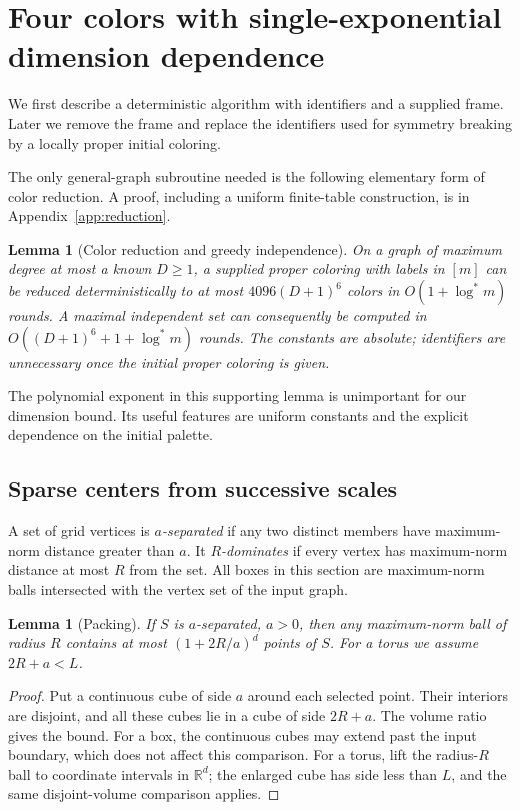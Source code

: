 \documentclass[11pt]{article}
\newtheorem{lemma}[theorem]{Lemma}
\theoremstyle{definition}\newtheorem{definition}[theorem]{Definition}
\theoremstyle{remark}\newtheorem{remark}[theorem]{Remark}
\newcommand{\R}{\mathbb R}
\newcommand{\ls}{\log^*}
\begin{document}
\section{Four colors with single-exponential dimension dependence}
\label{sec:upper}

We first describe a deterministic algorithm with identifiers and a
supplied frame. Later we remove the frame and replace the identifiers
used for symmetry breaking by a locally proper initial coloring.

The only general-graph subroutine needed is the following elementary
form of color reduction. A proof, including a uniform finite-table
construction, is in Appendix~\ref{app:reduction}.

\begin{lemma}[Color reduction and greedy independence]\label{lem:reduction}
On a graph of maximum degree at most a known $D\ge1$, a supplied
proper coloring with labels in $[m]$ can be reduced deterministically
to at most $4096(D+1)^6$ colors in $O(1+\ls m)$ rounds.
A maximal independent set can consequently be computed in
$O((D+1)^6+1+\ls m)$ rounds. The constants are absolute;
identifiers are unnecessary once the initial proper coloring is given.
\end{lemma}

The polynomial exponent in this supporting lemma is unimportant for
our dimension bound. Its useful features are uniform constants and
the explicit dependence on the initial palette.

\subsection{Sparse centers from successive scales}

A set of grid vertices is \emph{$a$-separated} if any two distinct
members have maximum-norm distance greater than $a$. It
\emph{$R$-dominates} if every vertex has maximum-norm distance at
most $R$ from the set. All boxes in this section are maximum-norm
balls intersected with the vertex set of the input graph.

\begin{lemma}[Packing]\label{lem:packingupper}
If $S$ is $a$-separated, $a>0$, then any maximum-norm ball of radius
$R$ contains at most $(1+2R/a)^d$ points of $S$. For a torus we
assume $2R+a<L$.
\end{lemma}

\begin{proof}
Put a continuous cube of side $a$ around each selected point.
Their interiors are disjoint, and all these cubes lie in a cube of
side $2R+a$. The volume ratio gives the bound. For a box, the
continuous cubes may extend past the input boundary, which does
not affect this comparison. For a torus, lift the radius-$R$ ball
to coordinate intervals in $\R^d$; the enlarged cube has side less
than $L$, and the same disjoint-volume comparison applies.
\end{proof}
\end{document}
